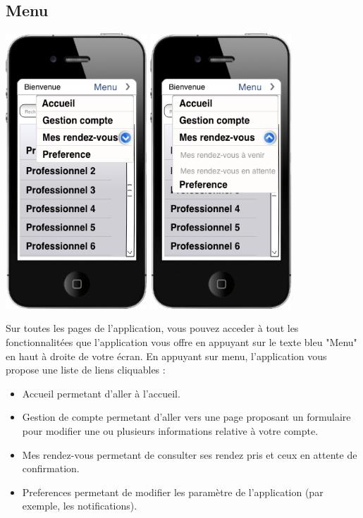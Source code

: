\documentclass{article}
\begin{document}
\subsection{Menu}
\begin{center}
  \includegraphics[width=150pt]{Interfaces/menuuser}
  \includegraphics[width=150pt]{Interfaces/menuuserdeplier}
\end{center}
Sur toutes les pages de l'application, vous pouvez acceder à tout les fonctionnalitées que l'application vous offre en appuyant sur le texte bleu "Menu" en haut à droite de votre écran. En appuyant sur menu, l'application vous propose une liste de liens cliquables :
\begin{itemize}
  \item Accueil permetant d'aller à l'accueil.
  \item Gestion de compte permetant d'aller vers une page proposant un formulaire pour modifier une ou plusieurs informations relative à votre compte.
  \item Mes rendez-vous permetant de consulter ses rendez pris et ceux en attente de confirmation.
  \item Preferences permetant de modifier les paramètre de l'application (par exemple, les notifications).
\end{itemize}
\end{document}
